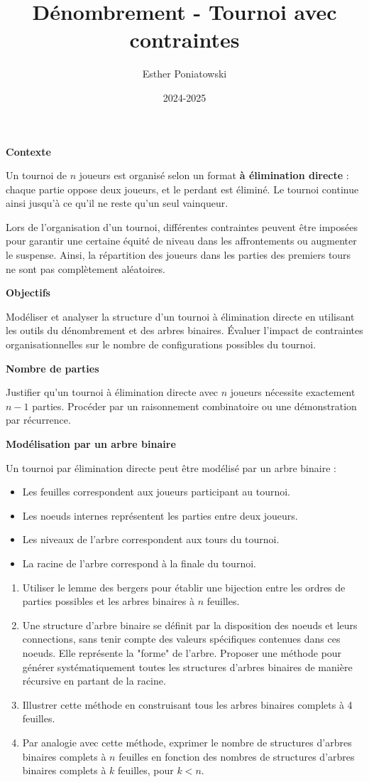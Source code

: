\documentclass[10pt,a4paper]{article}
\title{Dénombrement - Tournoi avec contraintes}
\author{Esther Poniatowski}
\date{2024-2025}
\begin{document}
\textbf{Contexte}

Un tournoi de \( n \) joueurs est organisé selon un format \textbf{à élimination directe} : chaque
partie oppose deux joueurs, et le perdant est éliminé. Le tournoi continue ainsi jusqu'à ce qu'il ne
reste qu'un seul vainqueur.

Lors de l'organisation d'un tournoi, différentes contraintes peuvent être imposées pour garantir une
certaine équité de niveau dans les affrontements ou augmenter le suspense. Ainsi, la répartition des
joueurs dans les parties des premiers tours ne sont pas complètement aléatoires.

\textbf{Objectifs}

Modéliser et analyser la structure d'un tournoi à élimination directe en utilisant les outils du
dénombrement et des arbres binaires. Évaluer l'impact de contraintes organisationnelles sur le
nombre de configurations possibles du tournoi.


\q \textbf{Nombre de parties}

Justifier qu'un tournoi à élimination directe avec \( n \) joueurs nécessite exactement \( n-1 \)
parties. Procéder par un raisonnement combinatoire ou une démonstration par récurrence.

\q \textbf{Modélisation par un arbre binaire}

Un tournoi par élimination directe peut être modélisé par un arbre binaire :
\begin{itemize}
    \item Les feuilles correspondent aux joueurs participant au tournoi.
    \item Les noeuds internes représentent les parties entre deux joueurs.
    \item Les niveaux de l'arbre correspondent aux tours du tournoi.
    \item La racine de l'arbre correspond à la finale du tournoi.
\end{itemize}



\begin{enumerate}
    \item Utiliser le lemme des bergers pour établir une bijection entre les ordres de parties
    possibles et les arbres binaires à $ n $ feuilles.
    \item Une structure d'arbre binaire se définit par la disposition des noeuds et leurs
    connections, sans tenir compte des valeurs spécifiques contenues dans ces noeuds. Elle
    représente la "forme" de l'arbre. Proposer une méthode pour générer systématiquement toutes les
    structures d'arbres binaires de manière récursive en partant de la racine.
    \item Illustrer cette méthode en construisant tous les arbres binaires complets à 4 feuilles.
    \item Par analogie avec cette méthode, exprimer le nombre de structures d'arbres binaires
    complets à $n$ feuilles en fonction des nombres de structures d'arbres binaires complets à $k$
    feuilles, pour $k < n$.
\end{enumerate}
\end{document}
